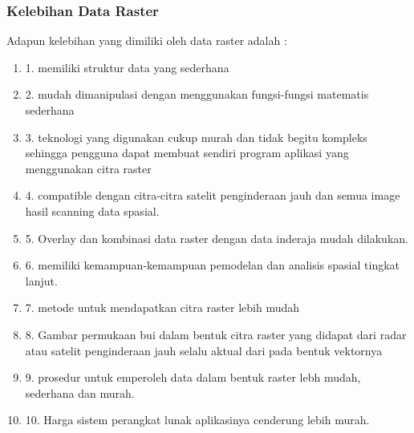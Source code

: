 \subsubsection{Kelebihan Data Raster}
Adapun kelebihan yang dimiliki oleh data raster adalah :
	\begin{enumerate}
		\item 1. memiliki struktur data yang sederhana
		\item 2. mudah dimanipulasi dengan menggunakan fungsi-fungsi matematis sederhana
		\item 3. teknologi yang digunakan cukup murah dan tidak begitu kompleks sehingga pengguna dapat membuat sendiri program aplikasi yang menggunakan citra raster
		\item 4. compatible dengan citra-citra satelit penginderaan jauh dan semua image hasil scanning data spasial.
		\item 5. Overlay dan kombinasi data raster dengan data inderaja mudah dilakukan.
		\item 6. memiliki kemampuan-kemampuan pemodelan dan analisis  spasial tingkat lanjut.
		\item 7. metode untuk mendapatkan citra raster lebih mudah
		\item 8. Gambar permukaan bui dalam bentuk citra raster yang didapat dari radar atau satelit penginderaan jauh selalu aktual dari pada bentuk vektornya
		\item 9. prosedur untuk emperoleh data dalam bentuk raster lebh mudah, sederhana dan murah.
		\item 10. Harga sistem perangkat lunak aplikasinya cenderung lebih murah.
	\end{enumerate}\cite{irwansyah2013sistem}

